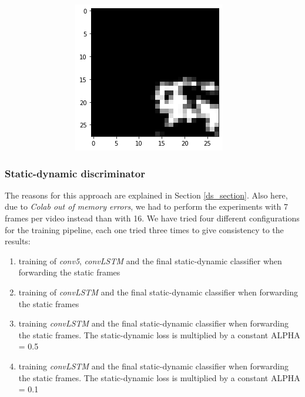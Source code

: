 \documentclass[10pt,twocolumn,hidelinks,letterpaper]{article}
\begin{document}
\begin{figure}[t]
\begin{subfigure}{.57\linewidth}
\begin{subfigure}{.32\linewidth}
  	\end{subfigure}
  	\begin{subfigure}{.32\linewidth}
  		\includegraphics[width=\linewidth]{images/mmaps_example/downsampling28x28_gray.png}
  	\end{subfigure}
  \end{subfigure}

	\caption{}
	\label{mmaps}
\end{figure}

\subsubsection{Static-dynamic discriminator}

The reasons for this approach are explained in Section \ref{ds_section}. Also here, due to \textit{Colab out of memory errors}, we had to perform the experiments with 7 frames per video instead than with 16. We have tried four different configurations for the training pipeline, each one tried three times to give consistency to the results:
\begin{enumerate}
  \item training of \textit{conv5}, \textit{convLSTM} and the final static-dynamic classifier when forwarding the static frames
  \item training of \textit{convLSTM} and the final static-dynamic classifier when forwarding the static frames
  \item training \textit{convLSTM} and the final static-dynamic classifier when forwarding the static frames. The static-dynamic loss is multiplied by a constant ALPHA = 0.5
  \item training \textit{convLSTM} and the final static-dynamic classifier when forwarding the static frames. The static-dynamic loss is multiplied by a constant ALPHA = 0.1
\end{enumerate}
\end{document}
